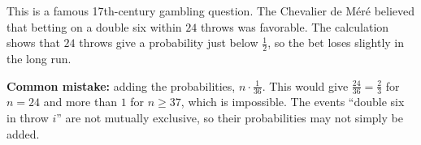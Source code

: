 \begin{solution}
\begin{answer}
	\end{answer}
	\begin{remark}
		This is a famous 17th-century gambling question. The Chevalier de Méré
		believed that betting on a double six within $24$ throws was
		favorable. The calculation shows that $24$ throws give a probability
		just below $\frac12$, so the bet loses slightly in the long run.
	\end{remark}
	\begin{remark}
		\textbf{Common mistake:} adding the probabilities,
		$n\cdot\frac1{36}$. This would give $\frac{24}{36}=\frac23$ for
		$n=24$ and more than $1$ for $n\ge37$, which is impossible. The events
		``double six in throw $i$'' are not mutually exclusive, so their
		probabilities may not simply be added.
	\end{remark}
\end{solution}
